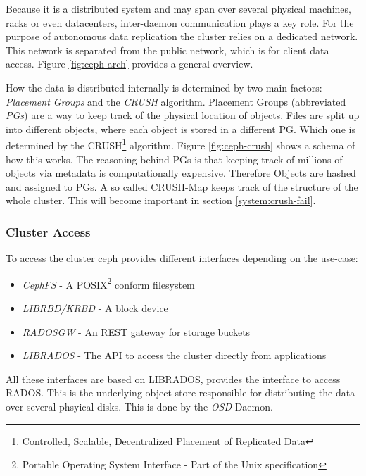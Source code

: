 \documentclass[titlepage, a4paper, 11pt]{scrartcl}
\begin{document}
            Because it is a distributed system and may span over several physical machines, racks or even datacenters, inter-daemon
            communication plays a key role. For the purpose of autonomous data replication the cluster relies on a dedicated network.
            This network is separated from the public network, which is for client data access. Figure \ref{fig:ceph-arch} provides a 
            general overview.

            How the data is distributed internally is determined by two main factors: \textit{Placement Groups} and the \textit{CRUSH} algorithm.
            Placement Groups (abbreviated \textit{PGs}) are a way to keep track of the physical location of objects.
            Files are split up into different objects, where each object is stored in a different PG. Which one is determined by the 
            CRUSH\footnote{Controlled, Scalable, Decentralized Placement of Replicated Data} algorithm\cite{weil2007ceph}. Figure \ref{fig:ceph-crush}
            shows a schema of how this works.
            The reasoning behind PGs is that keeping track of millions of objects via metadata is computationally expensive\cite{PGcephDocu}.
            Therefore Objects are hashed and assigned to PGs.
            A so called CRUSH-Map keeps track of the structure of the whole cluster. This will become important in section \ref{system:crush-fail}.

            \subsubsection{Cluster Access}

                To access the cluster ceph provides different interfaces depending on the use-case:

                \begin{itemize}
                    \item \textit{CephFS} - A POSIX\footnote{Portable Operating System Interface - Part of the Unix specification} conform filesystem
                    \item \textit{LIBRBD/KRBD} - A block device
                    \item \textit{RADOSGW} - An REST gateway for storage buckets
                    \item \textit{LIBRADOS} - The API to access the cluster directly from applications
                \end{itemize}

                All these interfaces are based on LIBRADOS, provides the interface to access RADOS. This is the underlying object store
                responsible for distributing the data over several phsyical disks. This is done by the \textit{OSD}-Daemon.
\end{document}
